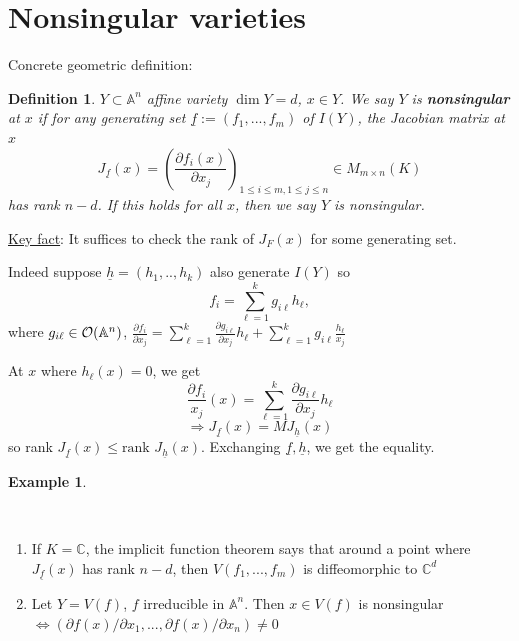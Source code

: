 \documentclass[11pt]{article}
\newtheorem{dfn}[thm]{Definition}
\newtheorem{ex}[thm]{Example}
\newcommand{\affn}{\mathbb A}
\newcommand{\cplx}{\mathbb C}
\newcommand{\calo}{{\cal O}}
\newcommand{\pd}{\partial}
\newcommand{\Lrta}{\Longrightarrow}
\newcommand{\Llrta}{\Longleftrightarrow}
\begin{document}
\section*{Nonsingular varieties}
Concrete geometric definition:
\begin{dfn}
$Y\subset \affn^n$ affine variety $\dim Y=d$, $x\in Y$. We say $Y$ is \textbf{nonsingular} at $x$ if for any generating set $\underline{f}:=(f_1,...,f_m)$ of $I(Y)$, the Jacobian matrix at $x$
$$
J_{\underline{f}}(x)=\left(\frac{\pd f_i(x)}{\pd x_j}\right)_{1\leq i\leq m, 1\leq j \leq n}\in M_{m\times n}(K)
$$
has rank $n-d$. If this holds for all $x$, then we say $Y$ is nonsingular.
\end{dfn}
\underline{Key fact}: It suffices to check the rank of $J_F(x)$ for some generating set. 

Indeed suppose $\underline{h}=(h_1,..,h_k)$ also generate $I(Y)$ so
$$
f_i = \sum^k_{\ell=1} g_{i\ell} h_\ell,
$$
where $g_{i\ell}\in \calo(\affn^n)$, $\frac{\pd f_i}{\pd x_j}=\sum^k_{\ell=1}\frac{\pd g_{i\ell}}{\pd x_j}h_\ell+\sum^k_{\ell=1}g_{i\ell}\frac{h_\ell}{x_j}$

At $x$ where $h_\ell(x)=0$, we get 
$$
\frac{\pd f_i}{x_j}(x)=\sum^k_{\ell=1}\frac{\pd g_{i\ell}}{\pd x_j}h_\ell
$$
$$
\Lrta J_{\underline{f}}(x)=M J_{\underline{h}}(x)
$$
so rank $J_{\underline{f}}(x)\leq \text{rank } J_{\underline{h}}(x)$. Exchanging $\underline{f},\underline{h}$, we get the equality.

\begin{ex}

\end{ex}\ 
\begin{enumerate}[label=(\arabic*)]
\item If $K=\cplx$, the implicit function theorem says that around a point where $J_{\underline{f}}(x)$ has rank $n-d$, then $V(f_1,...,f_m)$ is diffeomorphic to $\cplx^d$
\item Let $Y=V(f)$, $f$ irreducible in $\affn^n$. Then $x\in V(f)$ is nonsingular
$\Llrta(\pd f(x)/\pd x_1,...,\pd f(x)/\pd x_n)\neq 0$
\end{enumerate}
\end{document}
